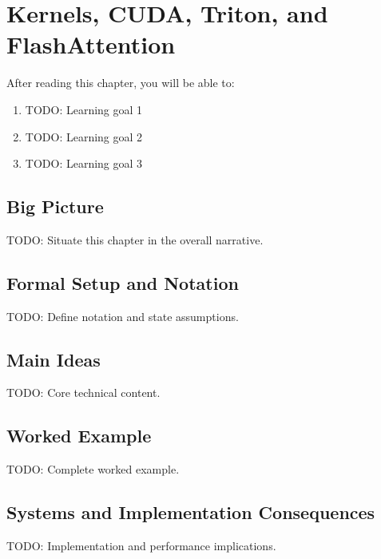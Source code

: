 \chapter{Kernels, CUDA, Triton, and FlashAttention}
\label{ch:16}

\begin{keyinsight}
After reading this chapter, you will be able to:
\begin{enumerate}
  \item TODO: Learning goal 1
  \item TODO: Learning goal 2
  \item TODO: Learning goal 3
\end{enumerate}
\end{keyinsight}

\section{Big Picture}
\label{ch:16:sec:big_picture}

TODO: Situate this chapter in the overall narrative.

\section{Formal Setup and Notation}
\label{ch:16:sec:setup}

TODO: Define notation and state assumptions.

\section{Main Ideas}
\label{ch:16:sec:main}

TODO: Core technical content.

\section{Worked Example}
\label{ch:16:sec:example}

TODO: Complete worked example.

\section{Systems and Implementation Consequences}
\label{ch:16:sec:systems}

TODO: Implementation and performance implications.

